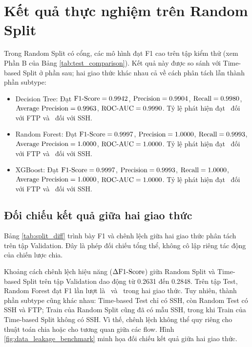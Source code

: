 
\section{Kết quả thực nghiệm trên Random Split}

Trong Random Split có cổng, các mô hình đạt F1 cao trên tập kiểm thử (xem Phần B của Bảng \ref{tab:test_comparison}). Kết quả này được so sánh với Time-based Split ở phần sau; hai giao thức khác nhau cả về cách phân tách lẫn thành phần subtype:
\begin{itemize}
    \item Decision Tree: Đạt $\text{F1-Score} = 0.9942$, $\text{Precision} = 0.9904$, $\text{Recall} = 0.9980$, $\text{Average Precision} = 0.9963$, $\text{ROC-AUC} = 0.9990$. Tỷ lệ phát hiện đạt \DTRandomFTPRecall\ đối với FTP và \DTRandomSSHRecall\ đối với SSH.
    \item Random Forest: Đạt $\text{F1-Score} = 0.9997$, $\text{Precision} = 1.0000$, $\text{Recall} = 0.9993$, $\text{Average Precision} = 1.0000$, $\text{ROC-AUC} = 1.0000$. Tỷ lệ phát hiện đạt \RFRandomFTPRecall\ đối với FTP và \RFRandomSSHRecall\ đối với SSH.
    \item XGBoost:
    Đạt $\text{F1-Score} = 0.9997$, $\text{Precision} = 0.9993$, $\text{Recall} = 1.0000$, $\text{Average Precision} = 1.0000$, $\text{ROC-AUC} = 1.0000$. Tỷ lệ phát hiện đạt \XGBRandomFTPRecall\ đối với FTP và \XGBRandomSSHRecall\ đối với SSH.
\end{itemize}

\subsection{Đối chiếu kết quả giữa hai giao thức}
Bảng \ref{tab:split_diff} trình bày F1 và chênh lệch giữa hai giao thức phân tách trên tập Validation. Đây là phép đối chiếu tổng thể, không cô lập riêng tác động của chiến lược chia.



Khoảng cách chênh lệch hiệu năng ($\Delta\text{F1-Score}$) giữa Random Split và Time-based Split trên tập Validation dao động từ 0.2631 đến 0.2848. Trên tập Test, Random Forest đạt F1 lần lượt là \RFTestFOne\ và \RFRandomFOne\ trong hai giao thức. Tuy nhiên, thành phần subtype cũng khác nhau: Time-based Test chỉ có SSH, còn Random Test có SSH và FTP; Train của Random Split cũng đã có mẫu SSH, trong khi Train của Time-based Split không có SSH. Vì thế, chênh lệch không thể quy riêng cho thuật toán chia hoặc cho tương quan giữa các flow. Hình \ref{fig:data_leakage_benchmark} minh họa đối chiếu kết quả giữa hai giao thức.


